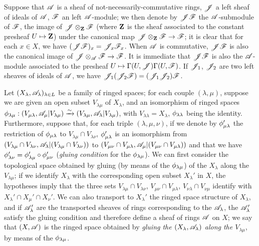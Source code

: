 \begin{env}[4.1.6]
\label{0.4.1.6}
Suppose that $\mathscr{A}$ is a sheaf of not-necessarily-commutative rings, $\mathscr{J}$
a left sheaf of ideals of $\mathscr{A}$, $\mathscr{F}$ an left $\mathscr{A}$-module; we then
denote by $\mathscr{J}\mathscr{F}$ the $\mathscr{A}$-submodule of $\mathscr{F}$, the image of
$\mathscr{J}\otimes_\mathbf{Z}\mathscr{F}$ (where $\mathbf{Z}$ is the sheaf associated to the
constant presheaf $U\mapsto\mathbf{Z}$) under the canonical map
$\mathscr{J}\otimes_\mathbf{Z}\mathscr{F}\to\mathscr{F}$; it is clear that for each $x\in X$, we
have $(\mathscr{J}\mathscr{F})_x=\mathscr{J}_x\mathscr{F}_x$. When $\mathscr{A}$ is commutative,
$\mathscr{J}\mathscr{F}$ is also the canonical image of
$\mathscr{J}\otimes_\mathscr{A}\mathscr{F}\to\mathscr{F}$. It is immediate that $\mathscr{J}\mathscr{F}$ is
also the $\mathscr{A}$-module associated to the presheaf
$U\mapsto\Gamma(U,\mathscr{J})\Gamma(U,\mathscr{F})$. If $\mathscr{J}_1$, $\mathscr{J}_2$ are two
left sheaves of ideals of $\mathscr{A}$, we have
$\mathscr{J}_1(\mathscr{J}_2\mathscr{F})=(\mathscr{J}_1\mathscr{J}_2)\mathscr{F}$.
\end{env}

\begin{env}[4.1.7]
\label{0.4.1.7}
Let $(X_\lambda,\mathscr{A}_\lambda)_{\lambda\in L}$ be a family of ringed spaces;
for each couple $(\lambda,\mu)$, suppose we are given an open subset
$V_{\lambda\mu}$ of $X_\lambda$, and an isomorphism of ringed spaces
$\phi_{\lambda\mu}:(V_{\mu\lambda},\mathscr{A}_\mu|V_{\lambda\mu})
  \xrightarrow{\sim}(V_{\lambda\mu},\mathscr{A}_\lambda|V_{\lambda\mu})$, with
$V_{\lambda\lambda}=X_\lambda$, $\phi_{\lambda\lambda}$ being the identity.
Furthermore, suppose that, for each triple $(\lambda,\mu,\nu)$, if we denote by
$\phi_{\mu\lambda}'$ the restriction of $\phi_{\mu\lambda}$ to
$V_{\lambda\mu}\cap V_{\lambda\nu}$, $\phi_{\mu\lambda}'$ is an isomorphism
from $(V_{\lambda\mu}\cap V_{\lambda\nu},
  \mathscr{A}_\lambda|(V_{\lambda\mu}\cap V_{\lambda\nu}))$ to
$(V_{\mu\nu}\cap V_{\mu\lambda},\mathscr{A}_\mu|(V_{\mu\nu}\cap V_{\mu\lambda}))$ and
that we have $\phi_{\lambda\nu}'=\phi_{\lambda\mu}'\circ\phi_{\mu\nu}'$
(\emph{gluing condition} for the $\phi_{\lambda\mu}$). We can first consider
the topological space obtained by gluing (by means of the $\phi_{\lambda\mu}$)
of the $X_\lambda$
along the $V_{\lambda\mu}$; if we identify $X_\lambda$ with the corresponding
open subset $X_\lambda'$ in $X$, the hypotheses imply that the three sets
$V_{\lambda\mu}\cap V_{\lambda\nu}$, $V_{\mu\nu}\cap V_{\mu\lambda}$,
$V_{\nu\lambda}\cap V_{\nu\mu}$ identify with
$X_\lambda'\cap X_\mu'\cap X_\nu'$. We can also transport to $X_\lambda'$ the
ringed space structure of $X_\lambda$, and if $\mathscr{A}_\lambda'$ are the
transported sheaves of rings corresponding to the $\mathscr{A}_\lambda$, the
$\mathscr{A}_\lambda'$ satisfy the gluing condition  and therefore
define a sheaf of rings $\mathscr{A}$ on $X$; we say that $(X,\mathscr{A})$ is the ringed
space obtained by \emph{gluing the $(X_\lambda,\mathscr{A}_\lambda)$ along the
$V_{\lambda\mu}$}, by means of the $\phi_{\lambda\mu}$.
\end{env}

